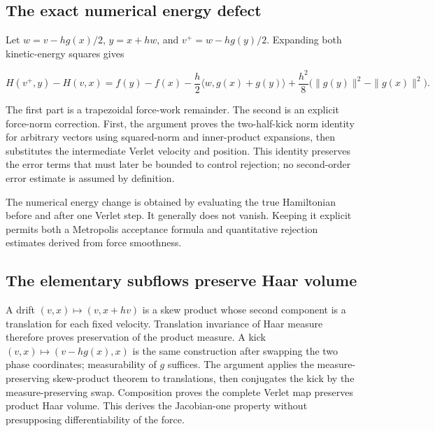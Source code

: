 \documentclass[11pt,a4paper]{report}
\begin{document}
\subsection{\texorpdfstring{The exact numerical energy defect}{The exact numerical energy defect}}
\label{report-step-KineticLangevin-Hamiltonian-lean-5}


Let \(w=v-hg(x)/2\), \(y=x+hw\), and \(v^+=w-hg(y)/2\). Expanding both kinetic-energy squares gives

\[H(v^+,y)-H(v,x)=f(y)-f(x)-\frac h2\langle w,g(x)+g(y)\rangle
+\frac{h^2}{8}\bigl(\|g(y)\|^2-\|g(x)\|^2\bigr).\]

The first part is a trapezoidal force-work remainder. The second is an explicit force-norm correction. First, the argument proves the two-half-kick norm identity for arbitrary vectors using squared-norm and inner-product expansions, then substitutes the intermediate Verlet velocity and position. This identity preserves the error terms that must later be bounded to control rejection; no second-order error estimate is assumed by definition.



The numerical energy change is obtained by evaluating the true Hamiltonian before and after one Verlet step. It generally does not vanish. Keeping it explicit permits both a Metropolis acceptance formula and quantitative rejection estimates derived from force smoothness.

\subsection{\texorpdfstring{The elementary subflows preserve Haar volume}{The elementary subflows preserve Haar volume}}
\label{report-step-KineticLangevin-Hamiltonian-lean-6}


A drift \((v,x)\mapsto(v,x+hv)\) is a skew product whose second component is a translation for each fixed velocity. Translation invariance of Haar measure therefore proves preservation of the product measure. A kick \((v,x)\mapsto(v-hg(x),x)\) is the same construction after swapping the two phase coordinates; measurability of \(g\) suffices. The argument applies the measure-preserving skew-product theorem to translations, then conjugates the kick by the measure-preserving swap. Composition proves the complete Verlet map preserves product Haar volume. This derives the Jacobian-one property without presupposing differentiability of the force.
\end{document}
